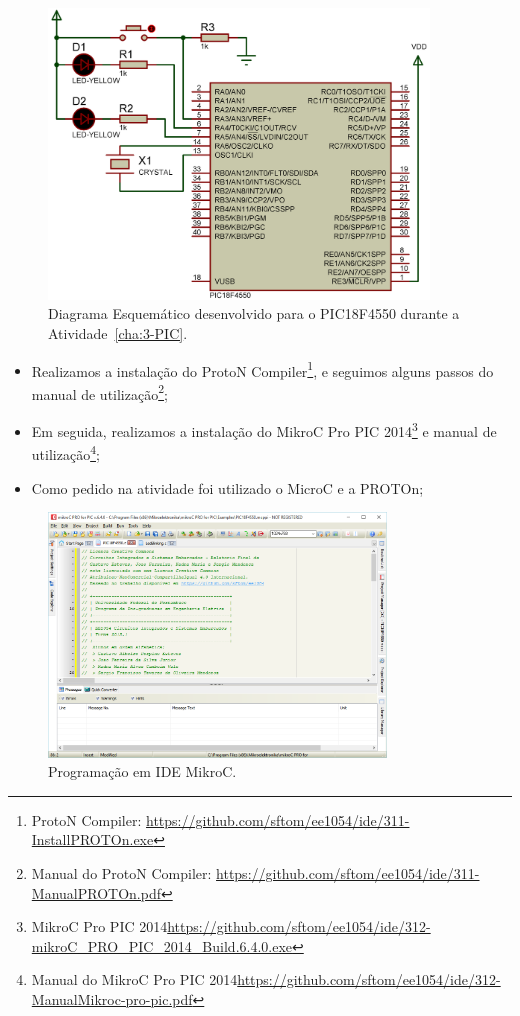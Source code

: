 \documentclass[
	12pt,				%
	openright,			%
  oneside,     %
	a4paper,			%
	english,			%
	french,				%
	spanish,			%
	brazil				%
	]{abntex2}
\begin{document}
\begin{figure}[ht]
  \centering
  \caption{\label{fig:Atividade-03-05-Schematic-01}Diagrama Esquemático desenvolvido para o PIC18F4550 durante a Atividade~\ref{cha:3-PIC}.}
  \includegraphics[width=0.9\textwidth]{images/Atividade03/Atividade-03-05-Schematic-01-recortado.png}
\end{figure}

\begin{itemize}
  \item Realizamos a instalação do ProtoN Compiler\footnote{ProtoN Compiler: \url{https://github.com/sftom/ee1054/ide/311-InstallPROTOn.exe}}, e seguimos alguns passos do manual de utilização\footnote{Manual do ProtoN Compiler: \url{https://github.com/sftom/ee1054/ide/311-ManualPROTOn.pdf}};
  \item Em seguida, realizamos a instalação do MikroC Pro PIC 2014\footnote{MikroC Pro PIC 2014\url{https://github.com/sftom/ee1054/ide/312-mikroC_PRO_PIC_2014_Build.6.4.0.exe}} e manual de utilização\footnote{Manual do MikroC Pro PIC 2014\url{https://github.com/sftom/ee1054/ide/312-ManualMikroc-pro-pic.pdf}};
  \item Como pedido na atividade foi utilizado o MicroC e a PROTOn;
\end{itemize}

\begin{figure}[ht]
  \centering
  \caption{\label{fig:cha-3-mikroC-Pro00}Programação em IDE MikroC.}
  \includegraphics[width=0.8\textwidth]{images/Atividade03/mikroC-PRO00.png}
\end{figure}
\end{document}
